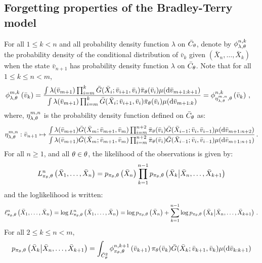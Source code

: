 \subsection*{Forgetting properties of the Bradley-Terry model}
For all $1\le k < n$ and all probability density function $\lambda$ on $\bar C_{\theta}$, denote by $\phi^{n,k}_{\lambda,\theta}$ the probability density of the conditional distribution of $\bar v_k$ given $(\bar X_n,\ldots,\bar X_k)$ when the state $\bar v_{n+1}$ has probability density function $\lambda$ on $\bar C_{\theta}$. Note that for all $1\le k \le n < m$,
\begin{align*}
\phi^{m,k}_{\lambda,\theta}\left(\bar v_{k}\right) &= \frac{\int \lambda(\bar v_{m+1})\prod_{i = m}^k\bar G(\bar X_i; \bar v_{i+1},\bar v_i) \bar \pi_{\theta}(\bar v_i)\mu(\mathrm{d} \bar v_{m+1:k+1})}{\int \lambda(\bar v_{m+1})\prod_{i = m}^k\bar G(\bar X_i; \bar v_{i+1},\bar v_i) \bar \pi_{\theta}(\bar v_i)\mu(\mathrm{d} \bar v_{m+1:k})} = \phi^{n,k}_{\eta^{m,n}_{\lambda,\theta},\theta}\left(\bar v_{k}\right)\,,
\end{align*}
where, $\eta^{m,n}_{\lambda,\theta}$ is the probability density function defined on $\bar C_{\theta}$ as:
\[
\eta^{m,n}_{\lambda,\theta}: \bar v_{n+1} \mapsto \frac{\int \lambda(\bar v_{m+1})\bar G(\bar X_m; \bar v_{m+1},\bar v_m)\prod_{i = m}^{n+2} \bar \pi_{\theta}(\bar v_i) \bar G(\bar X_{i-1}; \bar v_{i},\bar v_{i-1}) \mu(\mathrm{d} \bar v_{m+1:n+2})}{\int \lambda(\bar v_{m+1})\bar G(\bar X_m; \bar v_{m+1},\bar v_m)\prod_{i = m}^{n+2} \bar \pi_{\theta}(\bar v_i) \bar G(\bar X_{i-1}; \bar v_{i},\bar v_{i-1}) \mu(\mathrm{d} \bar v_{m+1:n+1})}\,.
\]
For all $n\ge1$, and all $\theta\in\theta$, the likelihood of the observations is given by:
\[
L^n_{\pi_{\theta},\theta}\left(\bar X_{1},\ldots,\bar X_{n}\right) = p_{\pi_{\theta},\theta}\left(\bar X_n\right)\prod_{k=1}^{n-1}p_{\pi_{\theta},\theta}\left(\bar X_{k}\middle| \bar X_{n},\ldots,\bar X_{k+1}\right)
\] 
and the loglikelihood is written:
\[
\ell^n_{\pi_{\theta},\theta}\left(\bar X_{1},\ldots,\bar X_{n}\right) = \log L^n_{\pi_{\theta},\theta}\left(\bar X_{1},\ldots,\bar X_{n}\right) = \log p_{\pi_{\theta},\theta}\left(\bar X_n\right) + \sum_{k=1}^{n-1}\log p_{\pi_{\theta},\theta}\left(\bar X_{k}\middle| \bar X_{n},\ldots,\bar X_{k+1}\right)\,.
\]
For all $2\le k\le n <m$,
\begin{equation}
\label{eq:incremental:likelihood}
p_{\pi_{\theta},\theta}\left(\bar X_{k}\middle| \bar X_{n},\ldots,\bar X_{k+1}\right) = \int_{\bar C_{\theta}^2}\phi^{n,k+1}_{\pi_{\theta},\theta}\left(\bar v_{k+1}\right)\pi_{\theta}(\bar v_{k})\bar G(\bar X_{k};\bar v_{k+1},\bar v_{k})\mu(\mathrm{d} \bar v_{k:k+1})
\end{equation}
